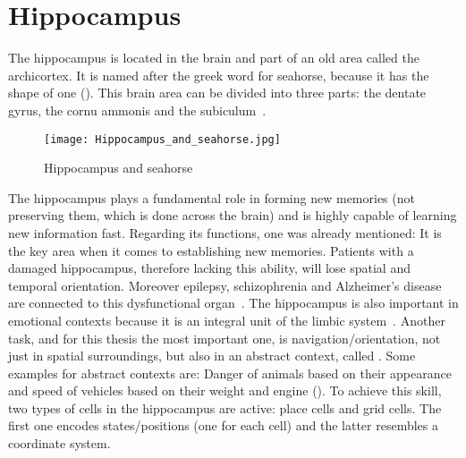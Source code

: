\section{Hippocampus} \label{sec: Hippocampus}
The hippocampus is located in the brain and part of an old area called the archicortex. It is named after the greek word for seahorse, because it has the shape of one (\figref{\ref{wrapfig: Hippocampus and seahorse}}). This brain area can be divided into three parts: the dentate gyrus, the cornu ammonis and the subiculum~\cite{ORFrHa20CCN, GarzorzStark18BN}.

\begin{wrapfigure}{r}{0.35\textwidth}
	\centering
		\texttt{[image: Hippocampus\_and\_seahorse.jpg]}
	\caption{Hippocampus and seahorse~\cite{Seress10H}} %
	\label{wrapfig: Hippocampus and seahorse}
\end{wrapfigure}
The hippocampus plays a fundamental role in forming new memories (not preserving them, which is done across the brain) and is highly capable of learning new information fast. Regarding its functions, one was already mentioned: It is the key area when it comes to establishing new memories. Patients with a damaged hippocampus, therefore lacking this ability, will lose spatial and temporal orientation. Moreover epilepsy, schizophrenia and Alzheimer's disease are connected to this dysfunctional organ~\cite{Trepel17N}.
The hippocampus is also important in emotional contexts because it is an integral unit of the limbic system~\cite{GarzorzStark18BN}. Another task, and for this thesis the most important one, is navigation/orientation, not just in spatial surroundings, but also in an abstract context, called \cognitiveroom{}. Some examples for abstract contexts are: Danger of animals based on their appearance and speed of vehicles based on their weight and engine (). To achieve this skill, two types of cells in the hippocampus are active: place cells and grid cells.
The first one encodes states/positions (one for each cell) and the latter resembles a coordinate system.
